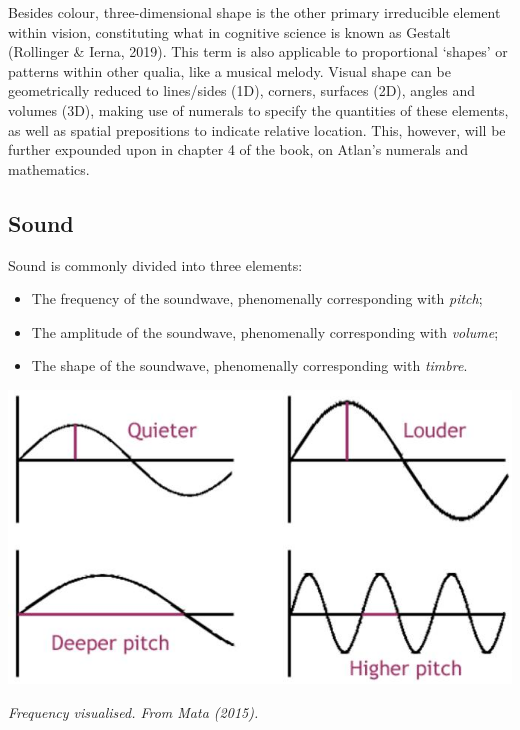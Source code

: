 Besides colour, three-dimensional shape is the other primary irreducible element within vision, constituting what in cognitive science is known as Gestalt (Rollinger \& Ierna, 2019). This term is also applicable to proportional ‘shapes’ or patterns within other qualia, like a musical melody. Visual shape can be geometrically reduced to lines/sides (1D), corners, surfaces (2D), angles and volumes (3D), making use of numerals to specify the quantities of these elements, as well as spatial prepositions to indicate relative location. This, however, will be further expounded upon in chapter 4 of the book, on Atlan’s numerals and mathematics.  


\subsection{Sound}

\noindent Sound is commonly divided into three elements:

\begin{itemize}
\item   The frequency of the soundwave, phenomenally corresponding with \textit{pitch}; 

\item   The amplitude of the soundwave, phenomenally corresponding with \textit{volume};

\item   The shape of the soundwave, phenomenally corresponding with \textit{timbre}.

\end{itemize}

\begin{center}
\includegraphics[scale=0.5]{./Images/Frequency.jpg}

{\it \footnotesize Frequency visualised. From Mata (2015).}
\end{center}


